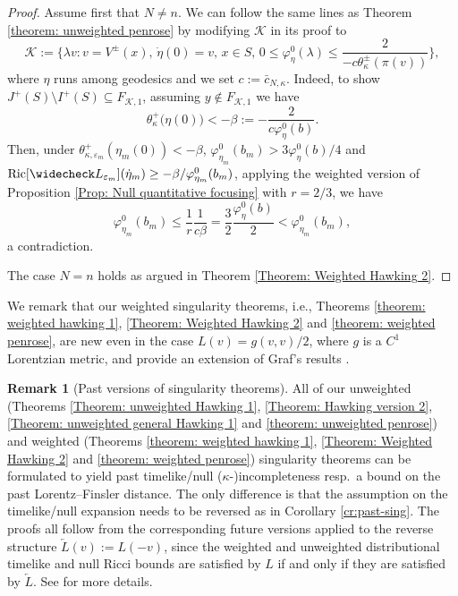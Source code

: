 \documentclass[a4paper,11pt]{article}
\numberwithin{equation}{section}
\theoremstyle{definition}
\newtheorem{Remark}[Definition]{Remark}
\theoremstyle{plain}
\newcommand{\eps}{\varepsilon}
\newcommand{\Ric}{\mathrm{Ric}}
\begin{document}
\begin{proof}
Assume first that $N\ne n$. 
We can follow the same lines as Theorem \ref{theorem: unweighted penrose} by modifying $\mathcal{K}$ in its proof to
\[
\mathcal{K} :=\biggl\{ \lambda v : v=V^\pm(x),\, \dot \eta(0) = v, \, x \in S,\, 0 \le \varphi^0_\eta(\lambda) \le \frac{2}{-c\theta_\kappa^\pm(\pi(v))} \biggr\},
\]
where $\eta$ runs among geodesics and we set $c:=\bar{c}_{N,\kappa}$.
Indeed, to show $J^+(S) \setminus I^+(S) \subseteq F_{\mathcal{K},1}$, assuming $y \not\in F_{\mathcal{K},1}$ we have
\[
\theta^+_\kappa \bigl(\eta(0)\bigr)
<-\beta :=-\frac{2}{c\varphi^0_\eta(b)}.
\]
Then, under $\theta^+_{\kappa,\eps_m}(\eta_m(0))<-\beta$, $\varphi^0_{\eta_m}(b_m) >3\varphi^0_\eta(b)/4$ and $\Ric[\widecheck L_{\eps_m}](\dot{\eta}_m) \ge -\beta/\varphi^0_{\eta_m}(b_m)$, applying the weighted version of Proposition \ref{Prop: Null quantitative focusing} with $r=2/3$, we have
\[
\varphi^0_{\eta_m}(b_m) \le \frac{1}{r} \frac{1}{c\beta} =\frac{3}{2} \frac{\varphi^0_\eta(b)}{2} <\varphi^0_{\eta_m}(b_m), \]
a contradiction.

The case $N = n$ holds as argued in Theorem \ref{Theorem: Weighted Hawking 2}.
\end{proof}


We remark that our weighted singularity theorems, i.e., Theorems \ref{theorem: weighted hawking 1}, \ref{Theorem: Weighted Hawking 2} and \ref{theorem: weighted penrose}, are new even in the case $L(v) = g(v,v)/2$, where $g$ is a $C^1$ Lorentzian metric, and provide an extension of Graf's results \cite{Graf-SingularityC1}.

\begin{Remark}[Past versions of singularity theorems]
\label{remark: past versions of singularity theorems}
All of our unweighted (Theorems \ref{Theorem: unweighted Hawking 1}, \ref{Theorem: Hawking version 2}, \ref{Theorem: unweighted general Hawking 1} and \ref{theorem: unweighted penrose}) and weighted (Theorems \ref{theorem: weighted hawking 1}, \ref{Theorem: Weighted Hawking 2} and \ref{theorem: weighted penrose}) singularity theorems can be formulated to yield past timelike/null ($\kappa$-)incompleteness resp.\ a bound on the past Lorentz--Finsler distance.
The only difference is that the assumption on the timelike/null expansion needs to be reversed as in Corollary \ref{cr:past-sing}. 
The proofs all follow from the corresponding future versions applied to the reverse structure $\overleftarrow{L}(v):=L(-v)$, since the weighted and unweighted distributional timelike and null Ricci bounds are satisfied by $L$ if and only if they are satisfied by $\overleftarrow{L}$.
See \cite[Rem.\ 8.14]{LuMinguzziOhtaSingularity} for more details.
\end{Remark}
\end{document}
